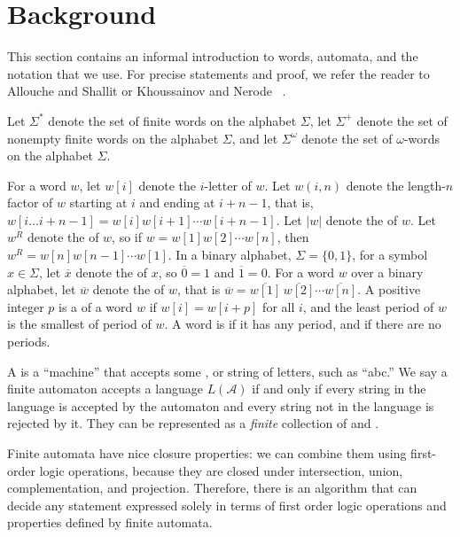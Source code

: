 \section{Background}\label{sec:background}

This section contains an informal introduction to words, automata, and the notation that we use.
For precise statements and proof, we refer the reader to Allouche and Shallit \cite{MR1997038} or Khoussainov and Nerode ~\cite{aut_theory}.

Let $\Sigma^*$ denote the set of finite words on the alphabet $\Sigma$, let $\Sigma^+$ denote the set of nonempty finite words on the alphabet $\Sigma$, and let $\Sigma^\omega$ denote the set of $\omega$-words on the alphabet $\Sigma$.

For a word $w$, let $w[i]$ denote the $i$-letter of $w$.
Let $w(i,n)$ denote the length-$n$ factor of $w$ starting at $i$ and ending at $i + n - 1$, that is, $w[i \ldots i + n - 1] = w[i] w[i + 1] \cdots w[i + n - 1]$.
Let $|w|$ denote the  of $w$.
Let $w^R$ denote the  of $w$, so if $w = w[1] w[2] \cdots w[n]$, then $w^R = w[n] w[n-1] \cdots w[1]$.
In a binary alphabet, $\Sigma = \{0,1\}$, for a symbol $x \in \Sigma$, let $\overline{x}$ denote the  of $x$, so $\overline{0} = 1$ and $\overline{1} = 0$.
For a word $w$ over a binary alphabet, let $\overline{w}$ denote the  of $w$, that is $\overline{w} = \overline{w[1]} \, \overline{w[2]} \cdots \overline{w[n]}$.
A positive integer $p$ is a  of a word $w$ if $w[i] = w[i + p]$ for all $i$, and the least period of $w$ is the smallest of period of $w$.
A word is  if it has any period, and  if there are no periods.

A  is a ``machine'' that accepts some , or string of letters, such as ``abc.''
We say a finite automaton accepts a language $L(\mathcal{A})$ if and only if every string in the language is accepted by the automaton and every string not in the language is rejected by it.
They can be represented as a \emph{finite} collection of  and .

Finite automata have nice closure properties: we can combine them using first-order logic operations, because they are closed under intersection, union, complementation, and projection.
Therefore, there is an algorithm that can decide any statement expressed solely in terms of first order logic operations and properties defined by finite automata.

